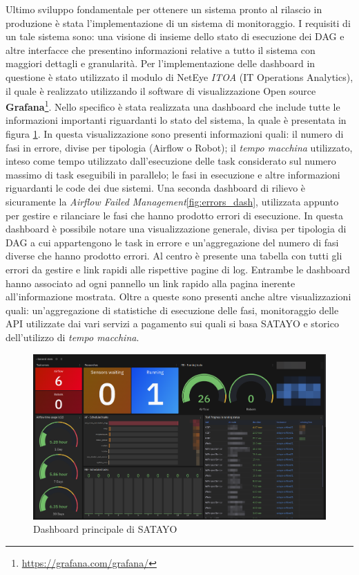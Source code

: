 Ultimo sviluppo fondamentale per ottenere un sistema pronto al rilascio in
produzione è stata l'implementazione di un sistema di monitoraggio. I requisiti di
un tale sistema sono: una visione di insieme dello stato di esecuzione dei DAG e
altre interfacce che presentino informazioni relative a tutto il sistema con
maggiori dettagli e granularità. Per l'implementazione delle dashboard in questione
è stato utilizzato il modulo di NetEye \textit{ITOA} (IT Operations Analytics), il
quale è realizzato utilizzando il software di visualizzazione Open source \textbf{Grafana}\footnote{\url{https://grafana.com/grafana/}}.
Nello specifico è stata realizzata una dashboard che include tutte le
informazioni importanti riguardanti lo stato del sistema, la quale è presentata in
figura \ref{fig:main_dash}. In questa visualizzazione sono presenti informazioni
quali: il numero di fasi in errore, divise per tipologia (Airflow o Robot); il \textit{tempo
macchina} utilizzato, inteso come tempo utilizzato dall'esecuzione delle task considerato
sul numero massimo di task eseguibili in parallelo; le fasi in esecuzione e
altre informazioni riguardanti le code dei due sistemi. Una seconda dashboard di
rilievo è sicuramente la \textit{Airflow Failed Management}\ref{fig:errors_dash},
utilizzata appunto per gestire e rilanciare le fasi che hanno prodotto errori di
esecuzione. In questa dashboard è possibile notare una visualizzazione generale,
divisa per tipologia di DAG a cui appartengono le task in errore e un'aggregazione
del numero di fasi diverse che hanno prodotto errori. Al centro è presente una tabella
con tutti gli errori da gestire e link rapidi alle rispettive pagine di log.
Entrambe le dashboard hanno associato ad ogni pannello un link rapido alla
pagina inerente all'informazione mostrata. Oltre a queste sono presenti anche altre
visualizzazioni quali: un'aggregazione di statistiche di esecuzione delle fasi, monitoraggio
delle API utilizzate dai vari servizi a pagamento sui quali si basa SATAYO e storico
dell'utilizzo di \textit{tempo macchina}.

\begin{figure}[htbp]
  \centering
  \includegraphics[width=.9\linewidth]{images/SATAYO_main_dashboard.png}
  \caption{Dashboard principale di SATAYO}
  \label{fig:main_dash}
\end{figure}

